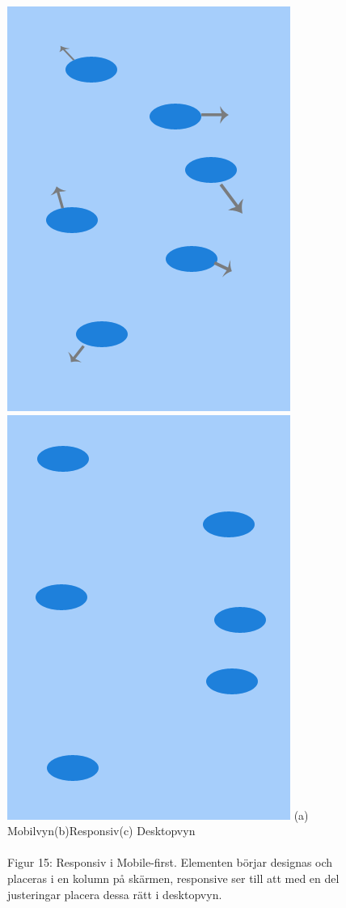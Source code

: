 \documentclass[11pt]{article}
\begin{document}
\begin{figure}[H]
{\includegraphics[scale=0.27]{pics/responsiv.png}\hspace{2em}%
\includegraphics[scale=0.27]{pics/desktop.png}%
}
\hspace{2cm}(a) Mobilvyn\hspace{2.3cm}(b)Responsiv\hspace{2.1cm}(c) Desktopvyn
\\\\
\hspace{0.15cm}Figur 15: Responsiv i Mobile-first. Elementen börjar designas och placeras i en kolumn på skärmen, responsive ser till att med en del justeringar placera dessa rätt i desktopvyn.
\end{figure}
\end{document}
